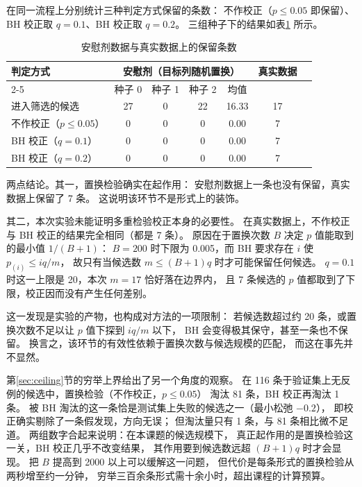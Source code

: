 在同一流程上分别统计三种判定方式保留的条数：
不作校正（$p \leq 0.05$ 即保留）、BH 校正取 $q = 0.1$、BH 校正取 $q = 0.2$。
三组种子下的结果如表\ref{tab:placebo} 所示。

\begin{table}[H]
\centering
\small
\caption{安慰剂数据与真实数据上的保留条数}
\label{tab:placebo}
\begin{tabular}{@{}lcccccc@{}}
\toprule
判定方式 & \multicolumn{4}{c}{安慰剂（目标列随机置换）} & 真实数据 \\
\cmidrule(lr){2-5}
 & 种子 0 & 种子 1 & 种子 2 & 均值 & \\
\midrule
进入筛选的候选 & 27 & 0 & 22 & 16.33 & 17 \\
不作校正（$p \leq 0.05$） & 0 & 0 & 0 & 0.00 & 7 \\
BH 校正（$q = 0.1$） & 0 & 0 & 0 & 0.00 & 7 \\
BH 校正（$q = 0.2$） & 0 & 0 & 0 & 0.00 & 7 \\
\bottomrule
\end{tabular}
\end{table}

两点结论。其一，置换检验确实在起作用：
安慰剂数据上一条也没有保留，真实数据上保留了 7 条。
这说明该环节不是形式上的装饰。

其二，本次实验未能证明多重检验校正本身的必要性。
在真实数据上，不作校正与 BH 校正的结果完全相同（都是 7 条）。
原因在于置换次数 $B$ 决定 $p$ 值能取到的最小值 $1/(B+1)$：
$B = 200$ 时下限为 0.005，而 BH 要求存在 $i$ 使 $p_{(i)} \leq i q / m$，
故只有当候选数 $m \leq (B+1)q$ 时才可能保留任何候选。
$q = 0.1$ 时这一上限是 20，本次 $m = 17$ 恰好落在边界内，
且 7 条候选的 $p$ 值都取到了下限，校正因而没有产生任何差别。

这一发现是实验的产物，也构成对方法的一项限制：
若候选数超过约 20 条，或置换次数不足以让 $p$ 值下探到 $i q / m$ 以下，
BH 会变得极其保守，甚至一条也不保留。
换言之，该环节的有效性依赖于置换次数与候选规模的匹配，
而这在事先并不显然。

第\ref{sec:ceiling}节的穷举上界给出了另一个角度的观察。
在 116 条于验证集上无反例的候选中，置换检验（不作校正，$p \leq 0.05$）
淘汰 81 条，BH 校正再淘汰 1 条。
被 BH 淘汰的这一条恰是测试集上失败的候选之一（最小松弛 $-0.2$），
即校正确实剔除了一条假发现，方向无误；
但淘汰量只有 1 条，与 81 条相比微不足道。
两组数字合起来说明：在本课题的候选规模下，
真正起作用的是置换检验这一关，BH 校正几乎不改变结果，
其作用要到候选数远超 $(B+1)q$ 时才会显现。
把 $B$ 提高到 2000 以上可以缓解这一问题，
但代价是每条形式的置换检验从两秒增至约一分钟，
穷举三百余条形式需十余小时，超出课程的计算预算。

